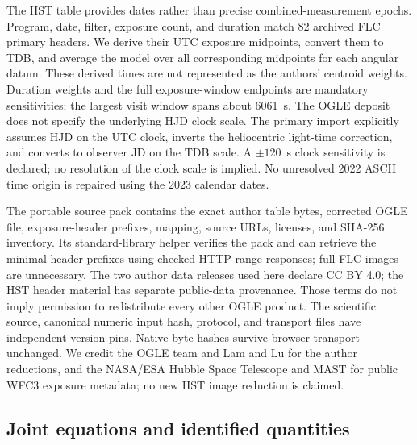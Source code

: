 The HST table provides dates rather than precise combined-measurement epochs.
Program, date, filter, exposure count, and duration match 82 archived FLC primary
headers. We derive their UTC exposure midpoints, convert them to TDB, and average
the model over all corresponding midpoints for each angular datum. These
derived times are not represented as the authors' centroid weights. Duration
weights and the full exposure-window endpoints are mandatory sensitivities;
the largest visit window spans about 6061~s. The OGLE deposit does not specify
the underlying HJD clock scale. The primary import explicitly assumes HJD on
the UTC clock, inverts the heliocentric light-time correction, and converts to
observer JD on the TDB scale. A $\pm120$~s clock sensitivity is declared; no
resolution of the clock scale is implied. No unresolved 2022 ASCII time origin is repaired using the 2023
calendar dates.

The portable source pack contains the exact author table bytes, corrected OGLE
file, exposure-header prefixes, mapping, source URLs, licenses, and SHA-256
inventory. Its standard-library helper verifies the pack and can retrieve the
minimal header prefixes using checked HTTP range responses; full FLC images
are unnecessary. The two author data releases used here declare CC BY 4.0;
the HST header material has separate public-data provenance. Those terms do not
imply permission to redistribute every other OGLE product. The scientific source,
canonical numeric input hash, protocol, and transport files have independent
version pins. Native byte hashes survive browser transport unchanged.
We credit the OGLE team and Lam and Lu for the author reductions, and the
NASA/ESA Hubble Space Telescope and MAST for public WFC3 exposure metadata;
no new HST image reduction is claimed.

\subsection{Joint equations and identified quantities}

